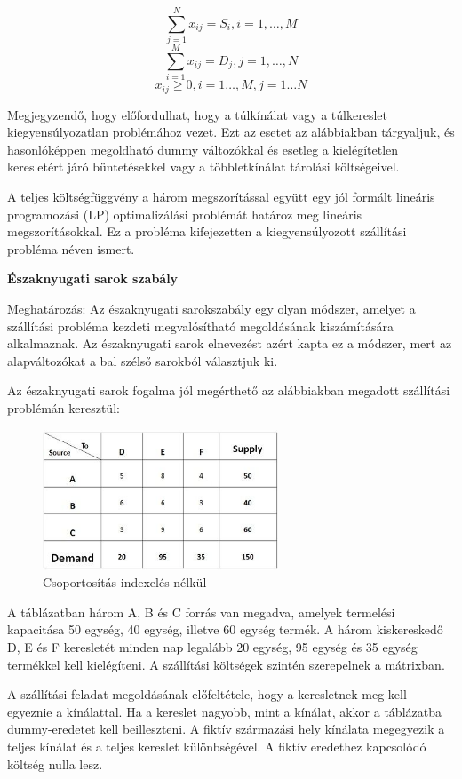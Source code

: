 $$\sum_{j=1}^N x_{ij} = S_{i}, i=1, …, M$$
$$\sum_{i=1}^M x_{ij} = D_{j}, j=1, …, N$$
$$x_{ij} \geqslant 0, i=1 …,M, j=1 …N$$

Megjegyzendő, hogy előfordulhat, hogy a túlkínálat vagy a túlkereslet kiegyensúlyozatlan problémához vezet. Ezt az esetet az alábbiakban tárgyaljuk, és hasonlóképpen megoldható dummy változókkal és esetleg a kielégítetlen keresletért járó büntetésekkel vagy a többletkínálat tárolási költségeivel.

A teljes költségfüggvény a három megszorítással együtt egy jól formált lineáris programozási (LP) optimalizálási problémát határoz meg lineáris megszorításokkal. Ez a probléma kifejezetten a kiegyensúlyozott szállítási probléma néven ismert.



\textbf{Északnyugati sarok szabály}

Meghatározás: Az északnyugati sarokszabály egy olyan módszer, amelyet a szállítási probléma kezdeti megvalósítható megoldásának kiszámítására alkalmaznak. Az északnyugati sarok elnevezést azért kapta ez a módszer, mert az alapváltozókat a bal szélső sarokból választjuk ki.

Az északnyugati sarok fogalma jól megérthető az alábbiakban megadott szállítási problémán keresztül:

\begin{figure}[h!]
	\centering
	\includegraphics[width=7cm]{images/1.jpg}
	\caption{Csoportosítás indexelés nélkül}
	\label{fig:explain_2_1}
\end{figure}

A táblázatban három A, B és C forrás van megadva, amelyek termelési kapacitása 50 egység, 40 egység, illetve 60 egység termék. A három kiskereskedő D, E és F keresletét minden nap legalább 20 egység, 95 egység és 35 egység termékkel kell kielégíteni. A szállítási költségek szintén szerepelnek a mátrixban.

A szállítási feladat megoldásának előfeltétele, hogy a keresletnek meg kell egyeznie a kínálattal. Ha a kereslet nagyobb, mint a kínálat, akkor a táblázatba dummy-eredetet kell beilleszteni. A fiktív származási hely kínálata megegyezik a teljes kínálat és a teljes kereslet különbségével. A fiktív eredethez kapcsolódó költség nulla lesz.

